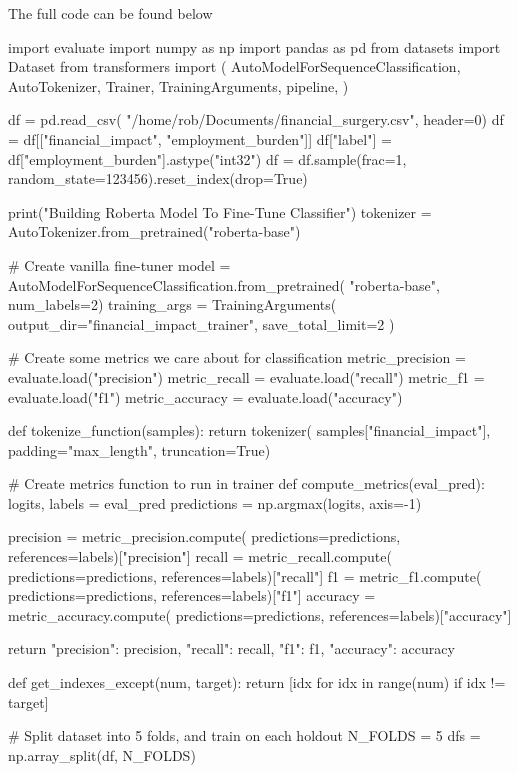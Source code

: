 The full code can be found below

\begin{python}

import evaluate
import numpy as np
import pandas as pd
from datasets import Dataset
from transformers import (
    AutoModelForSequenceClassification,
    AutoTokenizer,
    Trainer,
    TrainingArguments,
    pipeline,
)

df = pd.read_csv(
    "/home/rob/Documents/financial_surgery.csv",
    header=0)
df = df[["financial_impact", "employment_burden"]]
df["label"] = df["employment_burden"].astype("int32")
df = df.sample(frac=1,
    random_state=123456).reset_index(drop=True)

print("Building Roberta Model To Fine-Tune Classifier")
tokenizer = AutoTokenizer.from_pretrained("roberta-base")

# Create vanilla fine-tuner
model = AutoModelForSequenceClassification.from_pretrained(
    "roberta-base", num_labels=2)
training_args = TrainingArguments(
    output_dir="financial_impact_trainer",
    save_total_limit=2
)

# Create some metrics we care about for classification
metric_precision = evaluate.load("precision")
metric_recall = evaluate.load("recall")
metric_f1 = evaluate.load("f1")
metric_accuracy = evaluate.load("accuracy")


def tokenize_function(samples):
    return tokenizer(
        samples["financial_impact"],
        padding="max_length",
        truncation=True)

# Create metrics function to run in trainer
def compute_metrics(eval_pred):
    logits, labels = eval_pred
    predictions = np.argmax(logits, axis=-1)

    precision = metric_precision.compute(
        predictions=predictions,
        references=labels)["precision"]
    recall = metric_recall.compute(
        predictions=predictions,
        references=labels)["recall"]
    f1 = metric_f1.compute(
        predictions=predictions,
        references=labels)["f1"]
    accuracy = metric_accuracy.compute(
        predictions=predictions,
        references=labels)["accuracy"]

    return {
        "precision": precision,
        "recall": recall,
        "f1": f1,
        "accuracy": accuracy
    }


def get_indexes_except(num, target):
    return [idx for idx in range(num) if idx != target]

# Split dataset into 5 folds, and train on each holdout
N_FOLDS = 5
dfs = np.array_split(df, N_FOLDS)


\end{python}
